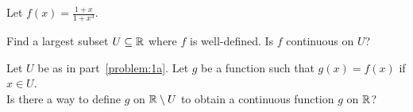 \begin{problem}
  Let $\displaystyle f(x) = \frac{1 + x}{1 + x^3}$.
  \begin{enumroman}
    \item Find a largest subset $U \subseteq \mathbb{R}$ where $f$ is well-defined.
      Is $f$ continuous on $U$?~\label{problem:1a}
      
      \begin{answer}

      \end{answer}

    \item Let $U$ be as in part~\ref{problem:1a}.
      Let $g$ be a function such that $g(x) = f(x)$ if $x \in U$. \\
      Is there a way to define $g$ on $\mathbb{R} \setminus U$ to obtain
      a continuous function $g$ on $\mathbb{R}$?~\label{problem:1b}
      
      \begin{answer}

      \end{answer}
  \end{enumroman}
\end{problem}
